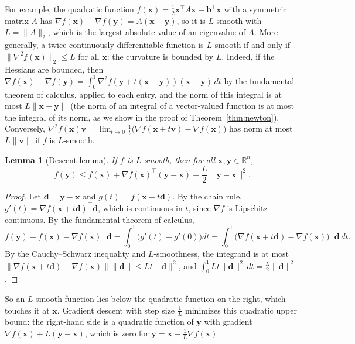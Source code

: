 \documentclass[11pt]{article}
\newcommand{\norm}[1]{\lVert #1 \rVert}
\theoremstyle{definition}
\theoremstyle{plain}
\newtheorem{lemma}[definition]{Lemma}
\theoremstyle{remark}
\begin{document}
For example, the quadratic function $f(\mathbf{x}) = \frac{1}{2}\mathbf{x}^\top A\mathbf{x} - \mathbf{b}^\top\mathbf{x}$ with a symmetric matrix $A$ has $\nabla f(\mathbf{x}) - \nabla f(\mathbf{y}) = A(\mathbf{x} - \mathbf{y})$, so it is $L$-smooth with $L = \norm{A}_2$, which is the largest absolute value of an eigenvalue of $A$. More generally, a twice continuously differentiable function is $L$-smooth if and only if $\norm{\nabla^2 f(\mathbf{x})}_2 \leq L$ for all $\mathbf{x}$: the curvature is bounded by $L$. Indeed, if the Hessians are bounded, then $\nabla f(\mathbf{x}) - \nabla f(\mathbf{y}) = \int_0^1 \nabla^2 f(\mathbf{y} + t(\mathbf{x} - \mathbf{y}))(\mathbf{x} - \mathbf{y})\, dt$ by the fundamental theorem of calculus, applied to each entry, and the norm of this integral is at most $L\norm{\mathbf{x} - \mathbf{y}}$ (the norm of an integral of a vector-valued function is at most the integral of its norm, as we show in the proof of Theorem~\ref{thm:newton}). Conversely, $\nabla^2 f(\mathbf{x})\mathbf{v} = \lim_{t \to 0} \frac{1}{t}\big(\nabla f(\mathbf{x} + t\mathbf{v}) - \nabla f(\mathbf{x})\big)$ has norm at most $L\norm{\mathbf{v}}$ if $f$ is $L$-smooth.

\begin{lemma}[Descent lemma]\label{lem:descent}
    If $f$ is $L$-smooth, then for all $\mathbf{x}, \mathbf{y} \in \mathbb{R}^n$,
    \[f(\mathbf{y}) \leq f(\mathbf{x}) + \nabla f(\mathbf{x})^\top(\mathbf{y} - \mathbf{x}) + \frac{L}{2}\norm{\mathbf{y} - \mathbf{x}}^2.\]
\end{lemma}

\begin{proof}
    Let $\mathbf{d} = \mathbf{y} - \mathbf{x}$ and $g(t) = f(\mathbf{x} + t\mathbf{d})$. By the chain rule, $g'(t) = \nabla f(\mathbf{x} + t\mathbf{d})^\top\mathbf{d}$, which is continuous in $t$, since $\nabla f$ is Lipschitz continuous. By the fundamental theorem of calculus,
    \[f(\mathbf{y}) - f(\mathbf{x}) - \nabla f(\mathbf{x})^\top\mathbf{d} = \int_0^1 \big(g'(t) - g'(0)\big) dt = \int_0^1 \big(\nabla f(\mathbf{x} + t\mathbf{d}) - \nabla f(\mathbf{x})\big)^\top\mathbf{d} \, dt.\]
    By the Cauchy--Schwarz inequality and $L$-smoothness, the integrand is at most $\norm{\nabla f(\mathbf{x} + t\mathbf{d}) - \nabla f(\mathbf{x})} \norm{\mathbf{d}} \leq Lt\norm{\mathbf{d}}^2$, and $\int_0^1 Lt\norm{\mathbf{d}}^2 \, dt = \frac{L}{2}\norm{\mathbf{d}}^2$.
\end{proof}

So an $L$-smooth function lies below the quadratic function on the right, which touches it at $\mathbf{x}$. Gradient descent with step size $\frac{1}{L}$ minimizes this quadratic upper bound: the right-hand side is a quadratic function of $\mathbf{y}$ with gradient $\nabla f(\mathbf{x}) + L(\mathbf{y} - \mathbf{x})$, which is zero for $\mathbf{y} = \mathbf{x} - \frac{1}{L}\nabla f(\mathbf{x})$.
\end{document}
